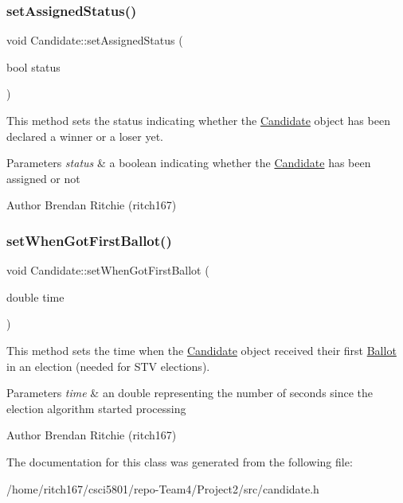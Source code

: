 \subsubsection{\texorpdfstring{set\+Assigned\+Status()}{setAssignedStatus()}}
{\footnotesize\ttfamily void Candidate\+::set\+Assigned\+Status (\begin{DoxyParamCaption}\item[{bool}]{status }\end{DoxyParamCaption})}

This method sets the status indicating whether the \hyperlink{classCandidate}{Candidate} object has been declared a winner or a loser yet. 
\begin{DoxyParams}{Parameters}
{\em status} & a boolean indicating whether the \hyperlink{classCandidate}{Candidate} has been assigned or not \\
\hline
\end{DoxyParams}
\begin{DoxyAuthor}{Author}
Brendan Ritchie (ritch167) 
\end{DoxyAuthor}
\mbox{\label{classCandidate_a97be1d696ea97201ec69a75bf708d9f2}} 
\subsubsection{\texorpdfstring{set\+When\+Got\+First\+Ballot()}{setWhenGotFirstBallot()}}
{\footnotesize\ttfamily void Candidate\+::set\+When\+Got\+First\+Ballot (\begin{DoxyParamCaption}\item[{double}]{time }\end{DoxyParamCaption})}

This method sets the time when the \hyperlink{classCandidate}{Candidate} object received their first \hyperlink{classBallot}{Ballot} in an election (needed for S\+TV elections). 
\begin{DoxyParams}{Parameters}
{\em time} & an double representing the number of seconds since the election algorithm started processing \\
\hline
\end{DoxyParams}
\begin{DoxyAuthor}{Author}
Brendan Ritchie (ritch167) 
\end{DoxyAuthor}


The documentation for this class was generated from the following file\+:\begin{DoxyCompactItemize}
\item 
/home/ritch167/csci5801/repo-\/\+Team4/\+Project2/src/candidate.\+h\end{DoxyCompactItemize}

